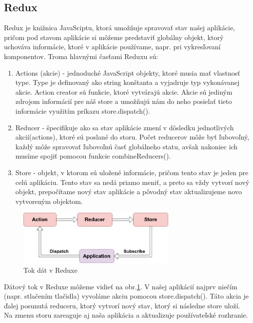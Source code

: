 \subsection{Redux}
Redux {\cite{redux}} je knižnica JavaSciptu, ktorá umožňuje spravovať stav našej aplikácie, pričom pod stavom aplikácie si môžeme predstaviť globálny objekt, ktorý uchováva informácie, ktoré v aplikácie používame, napr. pri vykresľovaní komponentov. 
Troma hlavnými časťami Reduxu sú:
\begin{enumerate}
\item Actions (akcie) - jednoduché JavaScript objekty, ktoré musia mať vlastnosť type. Type je definovaný ako string konštanta a vyjadruje typ vykonávanej akcie. Action creator sú funkcie, ktoré vytvárajú akcie. Akcie sú jediným zdrojom informácií pre náš store a umožňujú nám do neho posielať tieto informácie využitím príkazu store.dispatch().
\item Reducer - špecifikuje ako sa stav aplikácie zmení v dôsledku jednotlivých akcií(actions), ktoré sú poslané do storu. Počet reducerov môže byť ľubovoľný, každý môže spravovať ľubovoľnú časť globálneho statu, avšak nakoniec ich musíme spojiť pomocou funkcie combineReducers().
\item Store - objekt, v ktorom sú uložené informácie, pričom tento stav je jeden pre celú aplikáciu. Tento stav sa nedá priamo meniť, a preto sa vždy vytvorí nový objekt, prepočítame nový stav aplikácie a pôvodný stav aktualizujeme novo vytvoreným objektom.
\end{enumerate}

\begin{figure}[h]
\centering
\includegraphics[width=0.7\textwidth]{images/reduxDataFlow}
\caption{Tok dát v Reduxe}
\label{reduxFlow}
\end{figure}

Dátový tok v Reduxe môžeme vidieť na obr.\ref{reduxFlow}.
V našej aplikácií najprv niečím (napr. stlačením tlačidla) vyvoláme akciu pomocou store.dispatch(). Táto akcia je ďalej posunutá reduceru, ktorý vytvorí nový stav, ktorý si následne store uloží. Na zmenu storu zareaguje aj naša aplikácia a aktualizuje používateľské rozhranie.


